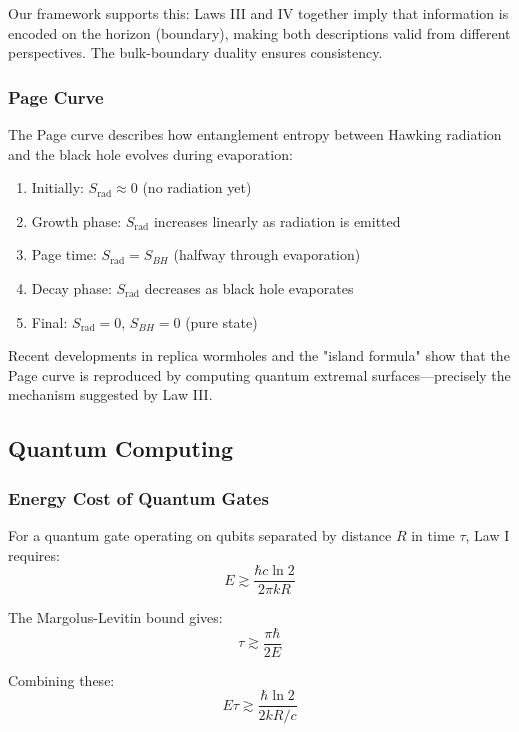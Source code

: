 \documentclass[11pt,a4paper]{article}
\theoremstyle{plain}
\theoremstyle{definition}
\theoremstyle{remark}
\begin{document}
Our framework supports this: Laws III and IV together imply that information is encoded on the horizon (boundary), making both descriptions valid from different perspectives. The bulk-boundary duality ensures consistency.

\subsubsection{Page Curve}

The Page curve describes how entanglement entropy between Hawking radiation and the black hole evolves during evaporation:

\begin{enumerate}[leftmargin=*]
\item Initially: $S_{\text{rad}} \approx 0$ (no radiation yet)
\item Growth phase: $S_{\text{rad}}$ increases linearly as radiation is emitted
\item Page time: $S_{\text{rad}} = S_{BH}$ (halfway through evaporation)
\item Decay phase: $S_{\text{rad}}$ decreases as black hole evaporates
\item Final: $S_{\text{rad}} = 0$, $S_{BH} = 0$ (pure state)
\end{enumerate}

Recent developments in replica wormholes and the "island formula" show that the Page curve is reproduced by computing quantum extremal surfaces—precisely the mechanism suggested by Law III.

\subsection{Quantum Computing}

\subsubsection{Energy Cost of Quantum Gates}

For a quantum gate operating on qubits separated by distance $R$ in time $\tau$, Law I requires:
\begin{equation}
E \gtrsim \frac{\hbar c\ln 2}{2\pi kR}
\end{equation}

The Margolus-Levitin bound gives:
\begin{equation}
\tau \gtrsim \frac{\pi\hbar}{2E}
\end{equation}

Combining these:
\begin{equation}
E\tau \gtrsim \frac{\hbar\ln 2}{2kR/c}
\end{equation}
\end{document}
